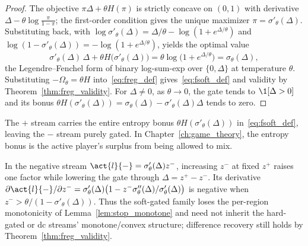 \begin{proof}
The objective $\pi \Delta + \theta H(\pi)$ is strictly concave on $(0,1)$ with derivative $\Delta - \theta \log\frac{\pi}{1-\pi}$; the first-order condition gives the unique maximizer $\pi = \sigma'_\theta(\Delta)$. Substituting back, with $\log \sigma'_\theta(\Delta) = \Delta/\theta - \log(1 + e^{\Delta/\theta})$ and $\log(1 - \sigma'_\theta(\Delta)) = -\log(1 + e^{\Delta/\theta})$, yields the optimal value
\begin{equation}
	\sigma'_\theta(\Delta)\, \Delta + \theta H\bigl(\sigma'_\theta(\Delta)\bigr) = \theta \log\bigl( 1 + e^{\Delta/\theta} \bigr) = \sigma_\theta(\Delta),
	\label{eq:legendre_fenchel_softplus}
\end{equation}
the Legendre--Fenchel form of binary log-sum-exp over $\{0,\Delta\}$ at temperature $\theta$. Substituting $-\Omega_\theta=\theta H$ into~\eqref{eq:freg_def} gives~\eqref{eq:fsoft_def} and validity by Theorem~\ref{thm:freg_validity}. For $\Delta\neq0$, as $\theta\to0$, the gate tends to $\1[\Delta>0]$ and its bonus $\theta H(\sigma'_\theta(\Delta))=\sigma_\theta(\Delta)-\sigma'_\theta(\Delta)\Delta$ tends to zero.
\end{proof}

The $+$ stream carries the entire entropy bonus $\theta H(\sigma'_\theta(\Delta))$ in~\eqref{eq:fsoft_def}, leaving the $-$ stream purely gated. In Chapter~\ref{ch:game_theory}, the entropy bonus is the active player's surplus from being allowed to mix.

\begin{remark}\label{rem:soft-monotone}
In the negative stream $\act{l}{-}=\sigma'_\theta(\Delta)z^-$, increasing $z^-$ at fixed $z^+$ raises one factor while lowering the gate through $\Delta=z^+-z^-$. Its derivative $\partial\act{l}{-}/\partial z^- = \sigma'_\theta(\Delta)\bigl(1-z^-\sigma''_\theta(\Delta)/\sigma'_\theta(\Delta)\bigr)$ is negative when $z^->\theta/(1-\sigma'_\theta(\Delta))$. Thus the soft-gated family loses the per-region monotonicity of Lemma~\ref{lem:stop_monotone} and need not inherit the hard-gated or \ac{dc} streams' monotone/convex structure; difference recovery still holds by Theorem~\ref{thm:freg_validity}.
\end{remark}

